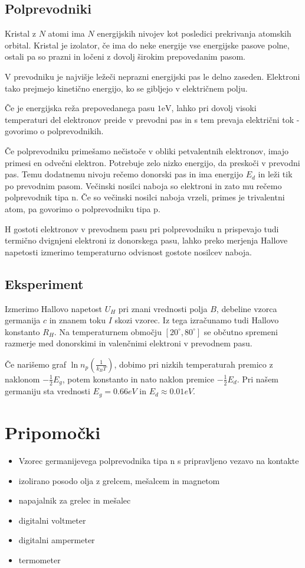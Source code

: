 \documentclass[11pt]{article}
\begin{document}
\subsection{Polprevodniki}\label{sec:org1c9d802}
Kristal z \(N\) atomi ima \(N\) energijskih nivojev kot posledici prekrivanja atomskih orbital. Kristal je izolator, če ima do neke energije vse energijske pasove polne, ostali pa so prazni in ločeni z dovolj širokim prepovedanim pasom.

V prevodniku je najvišje ležeči neprazni energijski pas le delno zaseden. Elektroni tako prejmejo kinetično energijo, ko se gibljejo v električnem polju. 

Če je energijska reža prepovedanega pasu \(1 \mathrm{eV}\), lahko pri dovolj visoki temperaturi del elektronov preide v prevodni pas in s tem prevaja električni tok - govorimo o polprevodnikih.

Če polprevodniku primešamo nečistoče v obliki petvalentnih elektronov, imajo primesi en odvečni elektron. Potrebuje zelo nizko energijo, da preskoči v prevodni pas. Temu dodatnemu nivoju rečemo donorski pas in ima energijo \(E_d\) in leži tik po prevodnim pasom. Večinski nosilci naboja so elektroni in zato mu rečemo polprevodnik tipa n. Če so večinski nosilci naboja vrzeli, primes je trivalentni atom, pa govorimo o polprevodniku tipa p.  

H gostoti elektronov v prevodnem pasu pri polprevodniku n prispevajo tudi termično dvignjeni elektroni iz donorskega pasu, lahko preko merjenja Hallove napetosti izmerimo temperaturno odvisnost gostote nosilcev naboja.
\subsection{Eksperiment}\label{sec:orgb97d12e}
Izmerimo Hallovo napetost \(U_H\) pri znani vrednosti polja \(B\), debeline vzorca germanija \(c\) in znanem toku \(I\) skozi vzorec. Iz tega izračunamo tudi Hallovo konstanto \(R_H\). Na temperaturnem območju \([20 ^{\circ}, 80^{\circ}]\) se občutno spremeni razmerje med donorskimi in valenčnimi elektroni v prevodnem pasu.

Če narišemo graf \(\ln n_p (\frac{1}{k_B T})\), dobimo pri nizkih temperaturah premico z naklonom \(- \frac{1}{2} E_g\), potem konstanto in nato naklon premice \(- \frac{1}{2}E_d\). Pri našem germaniju sta vrednosti \(E_g = 0.66eV\) in \(E_d \approx 0.01 eV\).
\section{Pripomočki}\label{sec:org054ebb6}
\begin{itemize}
\item Vzorec germanijevega polprevodnika tipa n s pripravljeno vezavo na kontakte
\item izolirano posodo olja z grelcem, mešalcem in magnetom
\item napajalnik za grelec in mešalec
\item digitalni voltmeter
\item digitalni ampermeter
\item termometer
\end{itemize}
\end{document}
